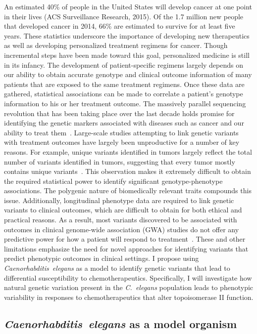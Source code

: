 \documentclass[12pt]{article}
\begin{document}
An estimated 40\% of people in the United States will develop cancer at one point in their lives (ACS Surveillance Research, 2015). Of the 1.7 million new people that developed cancer in 2014, 66\% are estimated to survive for at least five years. These statistics underscore the importance of developing new therapeutics as well as developing personalized treatment regimens for cancer. Though incremental steps have been made toward this goal, personalized medicine is still in its infancy. The development of patient-specific regimens largely depends on our ability to obtain accurate genotype and clinical outcome information of many patients that are exposed to the same treatment regimens. Once these data are gathered, statistical associations can be made to correlate a patient's genotype information to his or her treatment outcome. The massively parallel sequencing revolution that has been taking place over the last decade holds promise for identifying the genetic markers associated with diseases such as cancer and our ability to treat them~\cite{Koboldt:2013kw}. Large-scale studies attempting to link genetic variants with treatment outcomes have largely been unproductive for a number of key reasons. For example, unique variants identified in tumors largely reflect the total number of variants identified in tumors, suggesting that every tumor mostly contains unique variants~\cite{Koboldt:2013kw}. This observation makes it extremely difficult to obtain the required statistical power to identify significant genotype-phenotype associations. The polygenic nature of biomedically relevant traits compounds this issue. Additionally, longitudinal phenotype data are required to link genetic variants to clinical outcomes, which are difficult to obtain for both ethical and practical reasons. As a result, most variants discovered to be associated with outcomes in clinical genome-wide association (GWA) studies do not offer any predictive power for how a patient will respond to treatment~\cite{Park:2012bz}. These and other limitations emphasize the need for novel approaches for identifying variants that predict phenotypic outcomes in clinical settings. I propose using {\it Caenorhabditis~elegans} as a model to identify genetic variants that lead to differential susceptibility to chemotherapeutics. Specifically, I will investigate how natural genetic variation present in the  {\it C.~elegans} population leads to phenotypic variability in responses to chemotherapeutics that alter topoisomerase II function. 
\vspace{-10pt}
\subsection{{\itshape Caenorhabditis~elegans} as a model organism}
\end{document}
